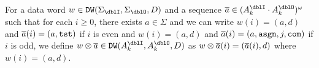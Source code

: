 For a data word
$w\in\DW(\Sigma_\dblI,\Sigma_\dblO,D)$ and
a sequence $\overa\in(A_k^\dblI\cdot A_k^\dblO)^\omega$
such that
for each $i\geq 0$, there exists
$a\in\Sigma$
and we can write
$w(i)=(a,d)$ and ${\overline{a}}(i)=(a,\mathtt{tst})$ if $i$ is even
and
$w(i)=(a,d)$ and ${\overline{a}}(i)=(a,\mathtt{asgn},j,\mathtt{com})$ if $i$ is odd,
we define $w\otimes\overa\in\DW(A_k^\dblI,A_k^\dblO,D)$ as
$w\otimes{\overline{a}}(i)=({\overline{a}}(i), d)$ where $w(i)=(a,d)$.

